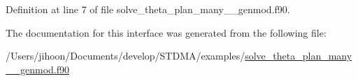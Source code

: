 Definition at line 7 of file solve\+\_\+theta\+\_\+plan\+\_\+many\+\_\+\+\_\+genmod.\+f90.



The documentation for this interface was generated from the following file\+:\begin{DoxyCompactItemize}
\item 
/\+Users/jihoon/\+Documents/develop/\+S\+T\+D\+M\+A/examples/\mbox{\hyperlink{solve__theta__plan__many____genmod_8f90}{solve\+\_\+theta\+\_\+plan\+\_\+many\+\_\+\+\_\+genmod.\+f90}}\end{DoxyCompactItemize}
